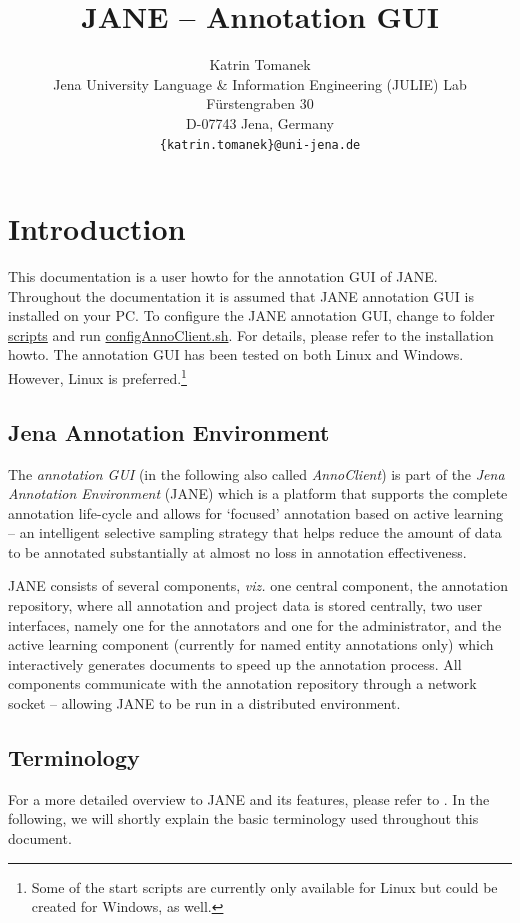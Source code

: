 \documentclass[DIV12,english,11pt,halfparskip]{scrartcl}
\title{JANE -- Annotation GUI}
\author{\normalsize Katrin Tomanek\\
  \normalsize  Jena University Language \& Information Engineering (JULIE) Lab\\
  \normalsize F\"urstengraben 30 \\
  \normalsize D-07743 Jena, Germany\\
  {\normalsize \tt \{katrin.tomanek\}@uni-jena.de} } \date{}
\begin{document}
\maketitle
\newpage
\tableofcontents
\newpage

\section{Introduction}


This documentation is a user howto for the annotation GUI of JANE.
Throughout the documentation it is assumed that JANE annotation GUI is
installed on your PC. To configure the JANE annotation GUI, change to
folder \url{scripts} and run \url{configAnnoClient.sh}. For details,
please refer to the installation howto. The annotation GUI has been
tested on both Linux and Windows. However, Linux is
preferred.\footnote{Some of the start scripts are currently only
  available for Linux but could be created for Windows, as well.}


\subsection{Jena Annotation Environment}

The \emph{annotation GUI} (in the following also called
\emph{AnnoClient}) is part of the \emph{Jena Annotation Environment}
(JANE) which is a platform that supports the complete annotation
life-cycle and allows for `focused' annotation based on active
learning -- an intelligent selective sampling strategy that helps
reduce the amount of data to be annotated substantially at almost no
loss in annotation effectiveness.

JANE consists of several components, \textit{viz.} one central
component, the annotation repository, where all annotation and project
data is stored centrally, two user interfaces, namely one for the
annotators and one for the administrator, and the active learning
component (currently for named entity annotations only) which
interactively generates documents to speed up the annotation process.
All components communicate with the annotation repository through a
network socket -- allowing JANE to be run in a distributed
environment.


\subsection{Terminology}
\label{ss:terminology}
For a more detailed overview to JANE and its features, please refer to
\cite{Tomanek2007law}. In the following, we will shortly explain the
basic terminology used throughout this document.
\end{document}
